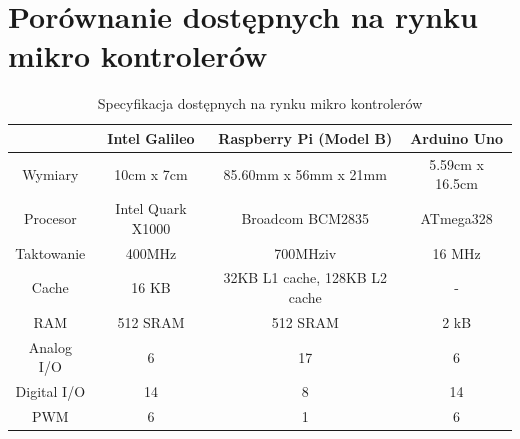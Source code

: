 \documentclass{xmgr}
\begin{document}
\chapter{Porównanie dostępnych na rynku mikro kontrolerów}
\begin{table}[!tbh]
\begin{tabular}{|c|c|c|c|} \hline
 & \textbf{Intel Galileo} & \textbf{Raspberry Pi (Model B)} & \textbf{Arduino Uno} \\ \hline
Wymiary & 10cm x 7cm & 85.60mm x 56mm x 21mm & 5.59cm x 16.5cm \\ \hline
Procesor & Intel Quark X1000 & Broadcom BCM2835 & ATmega328 \\ \hline
Taktowanie & 400MHz	& 700MHziv & 16 MHz\\ \hline
Cache & 16 KB & 32KB L1 cache, 128KB L2 cache & - \\ \hline
RAM & 512 SRAM & 512 SRAM & 2 kB \\ \hline
Analog I/O	& 6 & 17 & 6 \\ \hline
Digital I/O	& 14 & 8 & 14 \\ \hline
PWM	& 6 & 1 & 6 \\ \hline
\end{tabular}
\caption{Specyfikacja dostępnych na rynku mikro kontrolerów}
\end{table}
\end{document}
